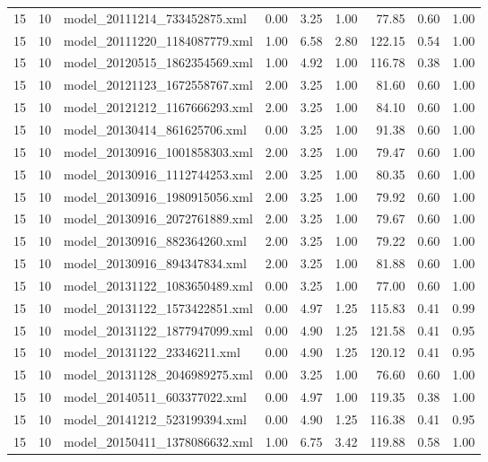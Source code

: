\begin{table}[ht]
\begin{tabular}{rrlrrrrrr}
   15 &  10 & model\_20111214\_733452875.xml & 0.00 & 3.25 & 1.00 & 77.85 & 0.60 & 1.00 \\ 
   15 &  10 & model\_20111220\_1184087779.xml & 1.00 & 6.58 & 2.80 & 122.15 & 0.54 & 1.00 \\ 
   15 &  10 & model\_20120515\_1862354569.xml & 1.00 & 4.92 & 1.00 & 116.78 & 0.38 & 1.00 \\ 
   15 &  10 & model\_20121123\_1672558767.xml & 2.00 & 3.25 & 1.00 & 81.60 & 0.60 & 1.00 \\ 
   15 &  10 & model\_20121212\_1167666293.xml & 2.00 & 3.25 & 1.00 & 84.10 & 0.60 & 1.00 \\ 
   15 &  10 & model\_20130414\_861625706.xml & 0.00 & 3.25 & 1.00 & 91.38 & 0.60 & 1.00 \\ 
   15 &  10 & model\_20130916\_1001858303.xml & 2.00 & 3.25 & 1.00 & 79.47 & 0.60 & 1.00 \\ 
   15 &  10 & model\_20130916\_1112744253.xml & 2.00 & 3.25 & 1.00 & 80.35 & 0.60 & 1.00 \\ 
   15 &  10 & model\_20130916\_1980915056.xml & 2.00 & 3.25 & 1.00 & 79.92 & 0.60 & 1.00 \\ 
   15 &  10 & model\_20130916\_2072761889.xml & 2.00 & 3.25 & 1.00 & 79.67 & 0.60 & 1.00 \\ 
   15 &  10 & model\_20130916\_882364260.xml & 2.00 & 3.25 & 1.00 & 79.22 & 0.60 & 1.00 \\ 
   15 &  10 & model\_20130916\_894347834.xml & 2.00 & 3.25 & 1.00 & 81.88 & 0.60 & 1.00 \\ 
   15 &  10 & model\_20131122\_1083650489.xml & 0.00 & 3.25 & 1.00 & 77.00 & 0.60 & 1.00 \\ 
   15 &  10 & model\_20131122\_1573422851.xml & 0.00 & 4.97 & 1.25 & 115.83 & 0.41 & 0.99 \\ 
   15 &  10 & model\_20131122\_1877947099.xml & 0.00 & 4.90 & 1.25 & 121.58 & 0.41 & 0.95 \\ 
   15 &  10 & model\_20131122\_23346211.xml & 0.00 & 4.90 & 1.25 & 120.12 & 0.41 & 0.95 \\ 
   15 &  10 & model\_20131128\_2046989275.xml & 0.00 & 3.25 & 1.00 & 76.60 & 0.60 & 1.00 \\ 
   15 &  10 & model\_20140511\_603377022.xml & 0.00 & 4.97 & 1.00 & 119.35 & 0.38 & 1.00 \\ 
   15 &  10 & model\_20141212\_523199394.xml & 0.00 & 4.90 & 1.25 & 116.38 & 0.41 & 0.95 \\ 
   15 &  10 & model\_20150411\_1378086632.xml & 1.00 & 6.75 & 3.42 & 119.88 & 0.58 & 1.00 \\ 

\end{tabular}
\end{table}
